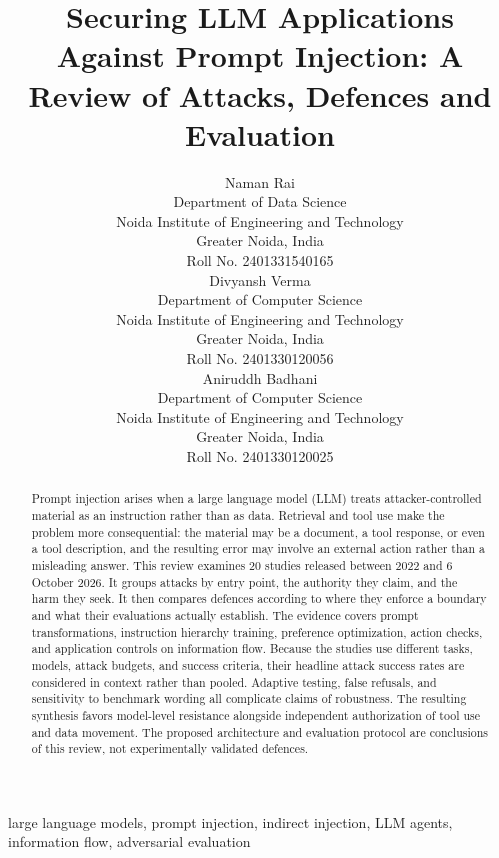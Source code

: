 \documentclass[conference]{IEEEtran}
\begin{document}
\title{Securing LLM Applications Against Prompt Injection: A Review of Attacks, Defences and Evaluation}
\author{
\begin{minipage}[t]{0.32\textwidth}\centering
Naman Rai\\
\footnotesize Department of Data Science\\
Noida Institute of Engineering and Technology\\
Greater Noida, India\\
Roll No. 2401331540165
\end{minipage}\hfill
\begin{minipage}[t]{0.32\textwidth}\centering
Divyansh Verma\\
\footnotesize Department of Computer Science\\
Noida Institute of Engineering and Technology\\
Greater Noida, India\\
Roll No. 2401330120056
\end{minipage}\hfill
\begin{minipage}[t]{0.32\textwidth}\centering
Aniruddh Badhani\\
\footnotesize Department of Computer Science\\
Noida Institute of Engineering and Technology\\
Greater Noida, India\\
Roll No. 2401330120025
\end{minipage}
}
\maketitle
\begin{abstract}
Prompt injection arises when a large language model (LLM) treats attacker-controlled material as an instruction rather than as data. Retrieval and tool use make the problem more consequential: the material may be a document, a tool response, or even a tool description, and the resulting error may involve an external action rather than a misleading answer. This review examines 20 studies released between 2022 and 6 October 2026. It groups attacks by entry point, the authority they claim, and the harm they seek. It then compares defences according to where they enforce a boundary and what their evaluations actually establish. The evidence covers prompt transformations, instruction hierarchy training, preference optimization, action checks, and application controls on information flow. Because the studies use different tasks, models, attack budgets, and success criteria, their headline attack success rates are considered in context rather than pooled. Adaptive testing, false refusals, and sensitivity to benchmark wording all complicate claims of robustness. The resulting synthesis favors model-level resistance alongside independent authorization of tool use and data movement. The proposed architecture and evaluation protocol are conclusions of this review, not experimentally validated defences.
\end{abstract}
\begin{IEEEkeywords}
large language models, prompt injection, indirect injection, LLM agents, information flow, adversarial evaluation
\end{IEEEkeywords}
\end{document}
